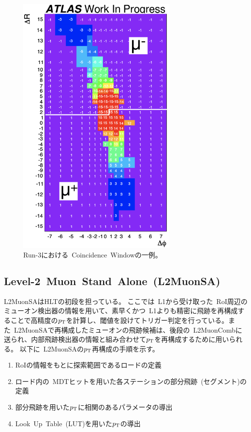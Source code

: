 \begin{figure}[h]
  \centering
  \includegraphics[clip, width=8cm]{fig/3/Run3CW.pdf}
  \caption{Run-3における~Coincidence~Windowの一例\cite{article:shiomi}。}
  \label{fig:3-5}
\end{figure}


\subsection{Level-2~Muon~Stand~Alone~(L2MuonSA)}\label{chapter3-2-2}
L2MuonSAはHLTの初段を担っている。
ここでは~L1から受け取った~RoI周辺のミューオン検出器の情報を用いて、素早くかつ~L1よりも精密に飛跡を再構成することで高精度の$p_\mathrm{T}$を計算し、閾値を設けてトリガー判定を行っている。また~L2MuonSAで再構成したミューオンの飛跡候補は、後段の~L2MuonCombに送られ、内部飛跡検出器の情報と組み合わせて$p_\mathrm{T}$を再構成するために用いられる。
以下に~L2MuonSAの$p_\mathrm{T}$再構成の手順を示す。
\begin{enumerate}
    \item RoIの情報をもとに探索範囲であるロードの定義
    \item ロード内の~MDTヒットを用いた各ステーションの部分飛跡~(セグメント)の定義
    \item 部分飛跡を用いた$p_\mathrm{T}$に相関のあるパラメータの導出
    \item Look~Up~Table~(LUT)を用いた$p_\mathrm{T}$の導出
\end{enumerate}

